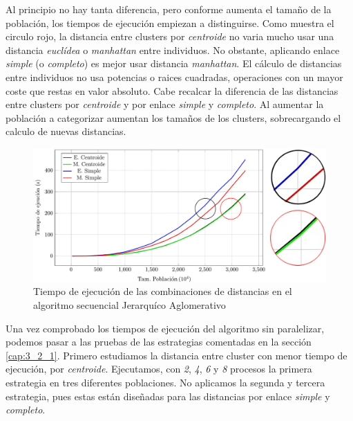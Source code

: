 		Al principio no hay tanta diferencia, pero conforme aumenta el tamaño de la población, los tiempos de ejecución empiezan a distinguirse. Como muestra el circulo rojo, la distancia entre clusters por \textit{centroide} no varia mucho usar una distancia \textit{euclídea} o \textit{manhattan} entre individuos. No obstante, aplicando enlace \textit{simple} (o \textit{completo}) es mejor usar distancia \textit{manhattan}. El cálculo de distancias entre individuos no usa potencias o raices cuadradas, operaciones con un mayor coste que restas en valor absoluto. Cabe recalcar la diferencia de las distancias entre clusters por \textit{centroide} y por enlace \textit{simple} y \textit{completo}. Al aumentar la población a categorizar aumentan los tamaños de los clusters, sobrecargando el calculo de nuevas distancias.
		
		
		\begin{figure}[!h]
			\centering
			\includegraphics[width=\textwidth]{images/chapter_4/jerarquico}
			\caption{Tiempo de ejecución de las combinaciones de distancias en el algoritmo secuencial Jerarquíco Aglomerativo}
			\label{fig:prueba_jerarquicosec}
		\end{figure}
	
			
			
		
		
		Una vez comprobado los tiempos de ejecución del algoritmo sin paralelizar, podemos pasar a las pruebas de las estrategias comentadas en la sección \ref{cap:3_2_1}. Primero estudiamos la distancia entre cluster con menor tiempo de ejecución, por \textit{centroide}. Ejecutamos, con \textit{2}, \textit{4}, \textit{6} y \textit{8} procesos la primera estrategia en tres diferentes poblaciones. No aplicamos la segunda y tercera estrategia, pues estas están diseñadas para las distancias por enlace \textit{simple} y \textit{completo}.
		

